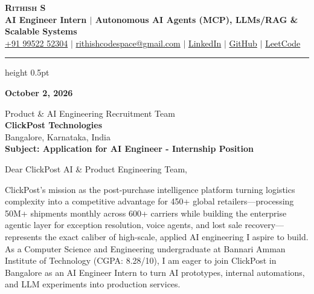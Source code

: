 \documentclass[letterpaper,11pt]{article}
\begin{document}
\begin{center}
    {\textbf{\Huge \scshape Rithish S}} \\ \vspace{3pt}
    {\small \textbf{\color{headingcolor}AI Engineer Intern $|$ Autonomous AI Agents (MCP), LLMs/RAG \& Scalable Systems}} \\ \vspace{3pt}
    \small
    \href{tel:+919952252304}{+91 99522 52304} $|$
    \href{mailto:rithishcodespace@gmail.com}{rithishcodespace@gmail.com} $|$
    \href{https://www.linkedin.com/in/rithish-saravanan-32a39431a/}{LinkedIn} $|$
    \href{https://github.com/rithishcodespace}{GitHub} $|$
    \href{https://leetcode.com/rithishcodespace}{LeetCode}
\end{center}

\vspace{-4pt}
\hrule height 0.5pt \relax
\vspace{8pt}

\textbf{October 2, 2026}

\vspace{2pt}
Product \& AI Engineering Recruitment Team \\
\textbf{ClickPost Technologies} \\
Bangalore, Karnataka, India \\

\vspace{3pt}
\textbf{Subject: Application for AI Engineer - Internship Position}

\vspace{3pt}
Dear ClickPost AI \& Product Engineering Team,

ClickPost's mission as the post-purchase intelligence platform turning logistics complexity into a competitive advantage for 450+ global retailers---processing 50M+ shipments monthly across 600+ carriers while building the enterprise agentic layer for exception resolution, voice agents, and lost sale recovery---represents the exact caliber of high-scale, applied AI engineering I aspire to build. As a Computer Science and Engineering undergraduate at Bannari Amman Institute of Technology (CGPA: 8.28/10), I am eager to join ClickPost in Bangalore as an AI Engineer Intern to turn AI prototypes, internal automations, and LLM experiments into production services.
\end{document}
